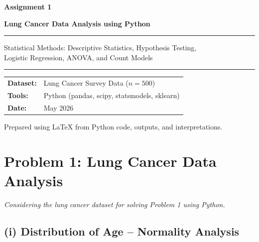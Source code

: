 \documentclass[12pt,a4paper]{article}
\begin{document}
\begin{titlepage}
  \centering
  \vspace*{2cm}
  {\huge\bfseries\color{titleblue} Assignment 1 \par}
  \vspace{0.5cm}
  {\Large\bfseries Lung Cancer Data Analysis using Python \par}
  \vspace{1cm}
  \rule{0.8\linewidth}{1pt}\par
  \vspace{0.5cm}
  {\large Statistical Methods: Descriptive Statistics, Hypothesis Testing,\\
  Logistic Regression, ANOVA, and Count Models \par}
  \vspace{1cm}
  \rule{0.8\linewidth}{0.5pt}\par
  \vspace{1.5cm}
  {\normalsize
    \begin{tabular}{ll}
      \textbf{Dataset:} & Lung Cancer Survey Data ($n = 500$) \\[4pt]
      \textbf{Tools:}   & Python (pandas, scipy, statsmodels, sklearn) \\[4pt]
      \textbf{Date:}    & May 2026 \\
    \end{tabular}
  }
  \vfill
  {\small Prepared using \LaTeX{} from Python code, outputs, and interpretations.}
\end{titlepage}

\tableofcontents
\newpage

\section{Problem 1: Lung Cancer Data Analysis}

\textit{Considering the lung cancer dataset for solving Problem 1 using Python.}

\subsection{(i) Distribution of Age -- Normality Analysis}
\end{document}
